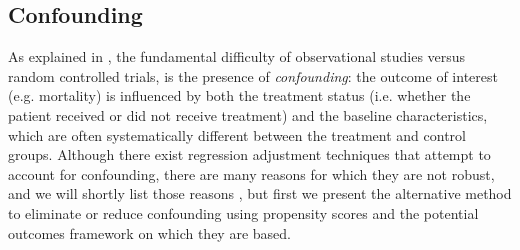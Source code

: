 \documentclass[11pt]{scrartcl}
\begin{document}
\subsection*{Confounding}
As explained in \cite{austin2011introduction}, the fundamental difficulty of observational studies versus random controlled trials, is the presence of \emph{confounding}:  the outcome of interest (e.g. mortality) is influenced by both the treatment status (i.e. whether the patient received or did not receive treatment) and the baseline characteristics, which are often systematically different between the treatment and control groups.  Although there exist regression adjustment techniques that attempt to account for confounding, there are many reasons for which they are not robust, and we will shortly list those reasons \cite{austin2011introduction,austin2011tutorial,mccaffrey2013tutorial}, but first we present the alternative method to eliminate or reduce confounding using propensity scores and the potential outcomes framework on which they are based.
\end{document}
